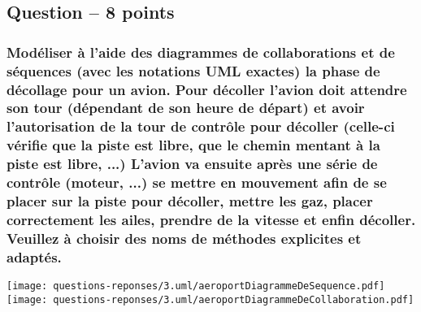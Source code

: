 \subsection{Question – 8 points}



\subsubsection[Fournir un diagramme de collaboration et de séquence complets sur un aéroport]{Modéliser à l'aide des diagrammes de collaborations et de séquences (avec les notations UML exactes) la phase de décollage pour un avion. Pour décoller l'avion doit attendre son tour (dépendant de son heure de départ) et avoir l'autorisation de la tour de contrôle pour décoller (celle-ci vérifie que la piste est libre, que le chemin mentant à la piste est libre, ...) L'avion va ensuite après une série de contrôle (moteur, ...) se mettre en mouvement afin de se placer sur la piste pour décoller, mettre les gaz, placer correctement les ailes, prendre de la vitesse et enfin décoller. Veuillez à choisir des noms de méthodes explicites et adaptés.}
\begin{center}
    \color[rgb]{0,0.48,0.58}
    \texttt{[image: questions-reponses/3.uml/aeroportDiagrammeDeSequence.pdf]}
    \texttt{[image: questions-reponses/3.uml/aeroportDiagrammeDeCollaboration.pdf]}
\end{center}